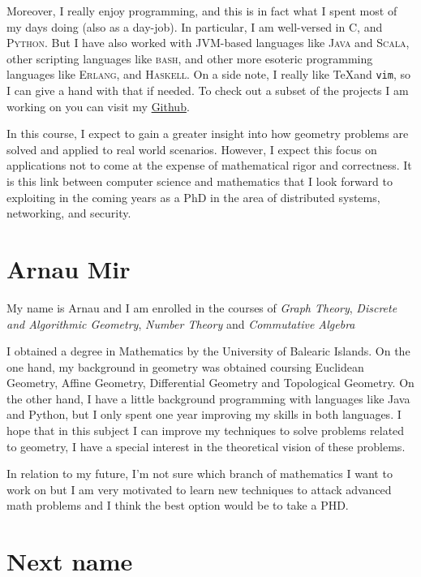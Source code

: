 \documentclass[11pt]{amsart}
\begin{document}
Moreover, I really enjoy programming, and this is in fact what I spent most of my days doing (also as a day-job).
In particular, I am well-versed in \textsc{C}, and \textsc{Python}.
But I have also worked with JVM-based languages like \textsc{Java} and \textsc{Scala}, other scripting languages like \textsc{bash}, and other more esoteric programming languages like \textsc{Erlang}, and \textsc{Haskell}. 
On a side note, I really like \TeX and \texttt{vim}, so I can give a hand with that if needed.
To check out a subset of the projects I am working on you can visit my \href{https://github.com/csegarragonz}{Github}.

In this course, I expect to gain a greater insight into how geometry problems are solved and applied to real world scenarios.
However, I expect this focus on applications not to come at the expense of mathematical rigor and correctness.
It is this link between computer science and mathematics that I look forward to exploiting in the coming years as a PhD in the area of distributed systems, networking, and security.

\medskip

\section*{Arnau Mir}
My name is Arnau and I am enrolled in the courses of \textit{Graph Theory}, \textit{Discrete and Algorithmic Geometry}, \textit{Number Theory} and \textit{Commutative Algebra}

I obtained a degree in Mathematics by the University of Balearic Islands. On the one hand, my background in geometry was obtained coursing Euclidean Geometry, Affine Geometry, Differential Geometry and Topological Geometry.
On the other hand, I have a little background programming with languages like Java and Python, but I only spent one year improving my skills in both languages. 
I hope that in this subject I can improve my techniques to solve problems related to geometry, I have a special interest in the theoretical vision of these problems.

In relation to my future, I'm not sure which branch of mathematics I want to work on but  I am very motivated to learn new techniques to attack advanced math problems and I think the best option would be to take a PHD.


\medskip

\section*{Next name}
\end{document}
